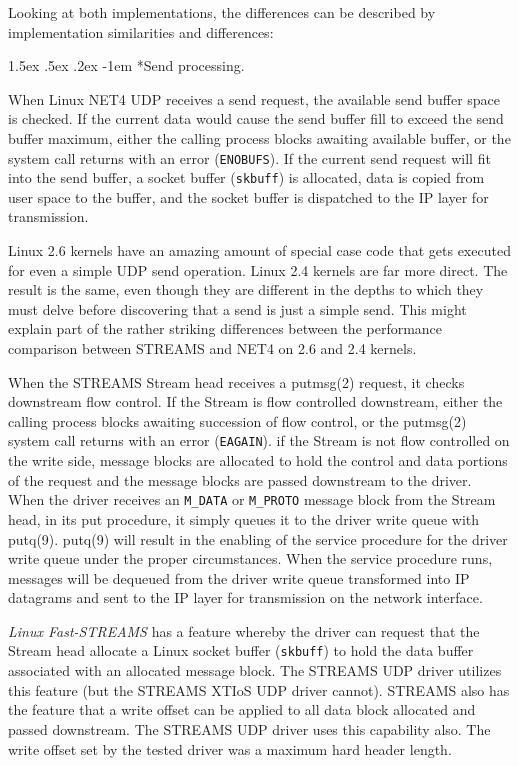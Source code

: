 \documentclass[letterpaper,final,notitlepage,twocolumn,10pt,twoside]{article}
\makeatletter
\renewcommand\paragraph{\@startsection{paragraph}{4}{\z@}%
                                    {1.5ex \@plus .5ex \@minus .2ex}%
                                    {-1em}%
                                    {\normalfont\normalsize\bfseries\slshape}}
\makeatother
\begin{document}
Looking at both implementations, the differences can be described by implementation similarities and
differences:

\paragraph*{Send processing.}

When Linux NET4 UDP receives a send request, the available send buffer space is checked.  If the
current data would cause the send buffer fill to exceed the send buffer maximum, either the calling
process blocks awaiting available buffer, or the system call returns with an error
(\texttt{ENOBUFS}).  If the current send request will fit into the send buffer, a socket buffer
(\texttt{skbuff}) is allocated, data is copied from user space to the buffer, and the socket buffer
is dispatched to the IP layer for transmission.

Linux 2.6 kernels have an amazing amount of special case code that gets executed for even a simple
UDP send operation.  Linux 2.4 kernels are far more direct.  The result is the same, even though they
are different in the depths to which they must delve before discovering that a send is just a simple
send.  This might explain part of the rather striking differences between the performance comparison
between STREAMS and NET4 on 2.6 and 2.4 kernels.

When the STREAMS Stream head receives a putmsg(2) request, it checks downstream flow control.  If
the Stream is flow controlled downstream, either the calling process blocks awaiting succession of
flow control, or the putmsg(2) system call returns with an error (\texttt{EAGAIN}).  if the Stream
is not flow controlled on the write side, message blocks are allocated to hold the control and data
portions of the request and the message blocks are passed downstream to the driver.  When the driver
receives an \texttt{M\_DATA} or \texttt{M\_PROTO} message block from the Stream head, in its put
procedure, it simply queues it to the driver write queue with putq(9).  putq(9) will result in the
enabling of the service procedure for the driver write queue under the proper circumstances.  When
the service procedure runs, messages will be dequeued from the driver write queue transformed into
IP datagrams and sent to the IP layer for transmission on the network interface.

\textsl{Linux Fast-STREAMS} has a feature whereby the driver can request that the Stream head
allocate a Linux socket buffer (\texttt{skbuff}) to hold the data buffer associated with an
allocated message block.  The STREAMS UDP driver utilizes this feature (but the STREAMS XTIoS UDP
driver cannot).  STREAMS also has the feature that a write offset can be applied to all data block
allocated and passed downstream.  The STREAMS UDP driver uses this capability also.  The write
offset set by the tested driver was a maximum hard header length.
\end{document}
